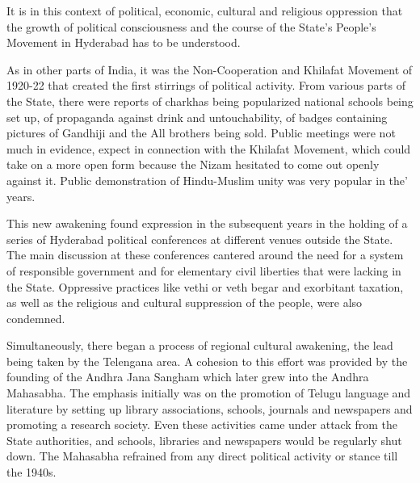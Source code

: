 It is in this context of political, economic, cultural and religious oppression that the growth of political consciousness and the course of the State's People's Movement in Hyderabad has to be understood. 

As in other parts of India, it was the Non-Cooperation and Khilafat Movement of 1920-22 that created the first stirrings of political activity. From various parts of the State, there were reports of charkhas being popularized national schools being set up, of propaganda against drink and untouchability, of badges containing pictures of Gandhiji and the All brothers being sold. Public meetings were not much in evidence, expect in connection with the Khilafat Movement, which could take on a more open form because the Nizam hesitated to come out openly against it. Public demonstration of Hindu-Muslim unity was very popular in the' years. 

This new awakening found expression in the subsequent years in the holding of a series of Hyderabad political conferences at different venues outside the State. The main discussion at these conferences cantered around the need for a system of responsible government and for elementary civil liberties that were lacking in the State. Oppressive practices like vethi or veth begar and exorbitant taxation, as well as the religious and cultural suppression of the people, were also condemned. 

Simultaneously, there began a process of regional cultural awakening, the lead being taken by the Telengana area. A cohesion to this effort was provided by the founding of the Andhra Jana Sangham which later grew into the Andhra Mahasabha. The emphasis initially was on the promotion of Telugu language and literature by setting up library associations, schools, journals and newspapers and promoting a research society. Even these activities came under attack from the State authorities, and schools, libraries and newspapers would be regularly shut down. The Mahasabha refrained from any direct political activity or stance till the 1940s. 

